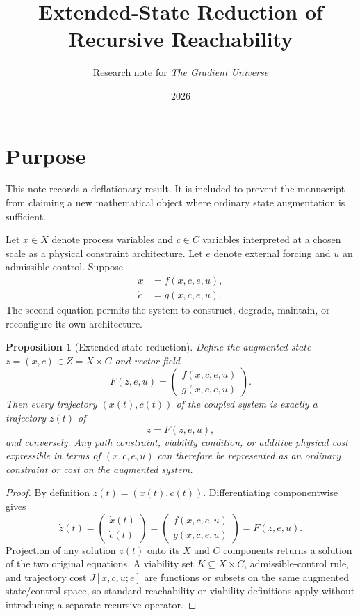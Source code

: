 \documentclass[11pt]{article}
\title{Extended-State Reduction of Recursive Reachability}
\author{Research note for \emph{The Gradient Universe}}
\date{2026}
\newtheorem{proposition}{Proposition}
\begin{document}
\maketitle

\section{Purpose}

This note records a deflationary result. It is included to prevent the manuscript from claiming a new mathematical object where ordinary state augmentation is sufficient.

Let $x\in X$ denote process variables and $c\in C$ variables interpreted at a chosen scale as a physical constraint architecture. Let $e$ denote external forcing and $u$ an admissible control. Suppose
\begin{align}
\dot{x} &= f(x,c,e,u),\\
\dot{c} &= g(x,c,e,u).
\end{align}
The second equation permits the system to construct, degrade, maintain, or reconfigure its own architecture.

\begin{proposition}[Extended-state reduction]
Define the augmented state $z=(x,c)\in Z=X\times C$ and vector field
\begin{equation}
F(z,e,u)=\begin{pmatrix}f(x,c,e,u)\\g(x,c,e,u)\end{pmatrix}.
\end{equation}
Then every trajectory $(x(t),c(t))$ of the coupled system is exactly a trajectory $z(t)$ of
\begin{equation}
\dot{z}=F(z,e,u),
\end{equation}
and conversely. Any path constraint, viability condition, or additive physical cost expressible in terms of $(x,c,e,u)$ can therefore be represented as an ordinary constraint or cost on the augmented system.
\end{proposition}

\begin{proof}
By definition $z(t)=(x(t),c(t))$. Differentiating componentwise gives
\begin{equation}
\dot{z}(t)=\begin{pmatrix}\dot{x}(t)\\\dot{c}(t)\end{pmatrix}
=\begin{pmatrix}f(x,c,e,u)\\g(x,c,e,u)\end{pmatrix}
=F(z,e,u).
\end{equation}
Projection of any solution $z(t)$ onto its $X$ and $C$ components returns a solution of the two original equations. A viability set $K\subseteq X\times C$, admissible-control rule, and trajectory cost $J[x,c,u;e]$ are functions or subsets on the same augmented state/control space, so standard reachability or viability definitions apply without introducing a separate recursive operator.
\end{proof}
\end{document}
